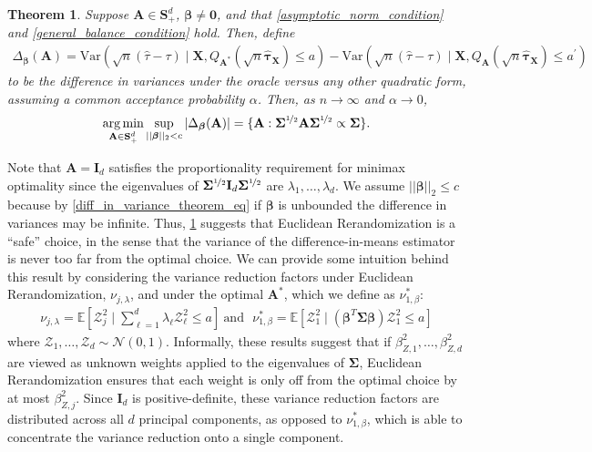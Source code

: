 \documentclass[11pt,twoside]{article}
\newtheorem{theorem}{Theorem}
\theoremstyle{definition}
\theoremstyle{remark}
\begin{document}
\begin{theorem} \label{euc_minimax}
    Suppose $\mathbf{A} \in \mathbf{S}^{d}_{+}$, $\bm{\beta} \neq \mathbf{0}$, and that \cref{asymptotic_norm_condition} and \cref{general_balance_condition} hold. Then, define
    \begin{align*}
        \Delta_{\bm{\beta}}(\mathbf{A}) = \text{Var}(\sqrt{n}(\widehat{\tau} - \tau) \mid \mathbf{X}, Q_{\mathbf{A}^*}(\sqrt{n} \widehat{\bm{\tau}}_{\mathbf{X}}) \leq a) - \text{Var}(\sqrt{n}(\widehat{\tau} - \tau) \mid \mathbf{X}, Q_{\mathbf{A}}(\sqrt{n} \widehat{\bm{\tau}}_{\mathbf{X}}) \leq a^\prime)
    \end{align*}
    to be the difference in variances under the oracle versus any other quadratic form, assuming a common acceptance probability $\alpha$. Then, as $n \to \infty$ and $\alpha \to 0$, 
\begin{align*}
            \operatorname*{arg\,min}_{\mathbf{A}\in\mathbf{S}^d_{+}}
        \sup_{||\bm{\beta}||_2<c} \left| \Delta_{\bm{\beta}}(\mathbf{A}) \right| = \{\mathbf{A} : \mathbf{\Sigma}^{\nicefrac{1}{2}} \mathbf{A} \mathbf{\Sigma}^{\nicefrac{1}{2}} \propto \mathbf{\Sigma}\}.
\end{align*}
\end{theorem}
Note that $\mathbf{A} = \mathbf{I}_d$ satisfies the proportionality requirement for minimax optimality since the eigenvalues of $\mathbf{\Sigma}^{\nicefrac{1}{2}} \mathbf{I}_d \mathbf{\Sigma}^{\nicefrac{1}{2}}$ are $\lambda_1, \ldots, \lambda_d$. We assume $||\bm{\beta}||_2 \leq c$ because by \cref{diff_in_variance_theorem_eq} if $\bm{\beta}$ is unbounded the difference in variances may be infinite. Thus, \cref{euc_minimax} suggests that Euclidean Rerandomization is a ``safe'' choice, in the sense that the variance of the difference-in-means estimator is never too far from the optimal choice. We can provide some intuition behind this result by considering the variance reduction factors under Euclidean Rerandomization, $\nu_{j, \lambda}$, and under the optimal $\mathbf{A}^*$, which we define as $\nu^*_{1, \beta}$:
\begin{align*}
    \nu_{j, \lambda} = \mathbb{E}\left[\mathcal{Z}^2_j \mid \sum^d_{\ell=1} \lambda_\ell \mathcal{Z}^2_\ell \leq a \right] \:\text{and} \: \: \:   \nu^*_{1, \beta} = \mathbb{E}\left[\mathcal{Z}^2_1 \mid \left(\bm{\beta}^T \mathbf{\Sigma} \bm{\beta}\right) \! \mathcal{Z}^2_1 \leq a \right]
\end{align*}
where $\mathcal{Z}_1, \ldots, \mathcal{Z}_d \sim \mathcal{N}(0, 1)$. Informally, these results suggest that if $\beta^2_{Z, 1}, \ldots, \beta^2_{Z, d}$ are viewed as unknown weights applied to the eigenvalues of $\mathbf{\Sigma}$, Euclidean Rerandomization ensures that each weight is only off from the optimal choice by at most $\beta^2_{Z, j}$. Since $\mathbf{I}_d$ is positive-definite, these variance reduction factors are distributed across all $d$ principal components, as opposed to $\nu^*_{1, \beta}$, which is able to concentrate the variance reduction onto a single component.
\end{document}
